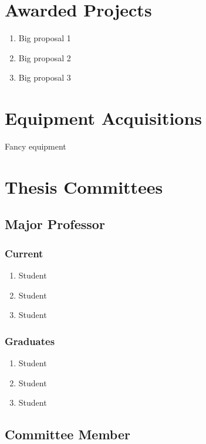 \documentclass[11pt,letterpaper]{article}
\begin{document}
\section*{Awarded Projects} %
\begin{enumerate}[leftmargin=*,topsep=0pt,itemsep=.15ex,partopsep=1ex,parsep=1ex,label=(\arabic*)]
    \item Big proposal 1
    \item Big proposal 2
    \item Big proposal 3
\end{enumerate}


\section*{Equipment Acquisitions}
Fancy equipment


\section*{Thesis Committees}
\subsection*{Major Professor}
\subsubsection*{Current}
\begin{enumerate}[leftmargin=*,topsep=0pt,itemsep=-1ex,partopsep=1ex,parsep=1ex,label=(\arabic*)]
    \item[] Student
    \item[] Student
    \item[] Student
\end{enumerate}

\subsubsection*{Graduates}
\begin{enumerate}[leftmargin=*,topsep=0pt,itemsep=-1ex,partopsep=1ex,parsep=1ex,label=(\arabic*)]
    \item[] Student
    \item[] Student
    \item[] Student
\end{enumerate}

\subsection*{Committee Member}
\end{document}
